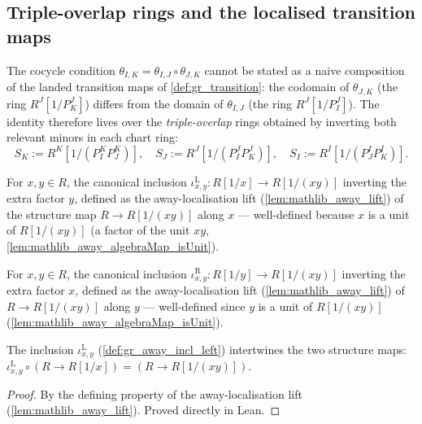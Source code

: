 \subsection*{Triple-overlap rings and the localised transition maps}

The cocycle condition \(\theta_{I,K} = \theta_{I,J} \circ \theta_{J,K}\) cannot
be stated as a naive composition of the landed transition maps of
\cref{def:gr_transition}: the codomain of \(\theta_{J,K}\) (the ring
\(R^J[1/P^J_K]\)) differs from the domain of \(\theta_{I,J}\) (the ring
\(R^J[1/P^J_I]\)). The identity therefore lives over the \emph{triple-overlap}
rings obtained by inverting both relevant minors in each chart ring:
\[
  S_K := R^K[1/(P^K_I P^K_J)], \quad
  S_J := R^J[1/(P^J_I P^J_K)], \quad
  S_I := R^I[1/(P^I_J P^I_K)].
\]

\begin{definition}

  \label{def:gr_away_incl_left}
  For \(x, y \in R\), the canonical inclusion
  \(\iota^{\mathrm{L}}_{x,y} : R[1/x] \to R[1/(xy)]\) inverting the extra factor
  \(y\), defined as the away-localisation lift (\cref{lem:mathlib_away_lift}) of
  the structure map \(R \to R[1/(xy)]\) along \(x\) — well-defined because \(x\)
  is a unit of \(R[1/(xy)]\) (a factor of the unit \(xy\),
  \cref{lem:mathlib_away_algebraMap_isUnit}).
\end{definition}

\begin{definition}

  \label{def:gr_away_incl_right}
  For \(x, y \in R\), the canonical inclusion
  \(\iota^{\mathrm{R}}_{x,y} : R[1/y] \to R[1/(xy)]\) inverting the extra factor
  \(x\), defined as the away-localisation lift (\cref{lem:mathlib_away_lift}) of
  \(R \to R[1/(xy)]\) along \(y\) — well-defined since \(y\) is a unit of
  \(R[1/(xy)]\) (\cref{lem:mathlib_away_algebraMap_isUnit}).
\end{definition}

\begin{lemma}

  \label{lem:gr_awayInclLeft_comp_algebraMap}
  The inclusion \(\iota^{\mathrm{L}}_{x,y}\) (\cref{def:gr_away_incl_left})
  intertwines the two structure maps:
  \(\iota^{\mathrm{L}}_{x,y} \circ (R \to R[1/x]) = (R \to R[1/(xy)])\).
\end{lemma}
\begin{proof}

\leanok
  By the defining property of the away-localisation lift
  (\cref{lem:mathlib_away_lift}). Proved directly in Lean.
\end{proof}

